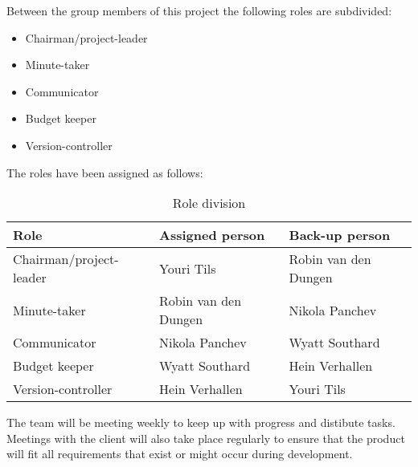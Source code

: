 Between the group members of this project the following roles are subdivided:
\begin{itemize}
    \setlength\itemsep{-0.3em}
    \item Chairman/project-leader
    \item Minute-taker
    \item Communicator
    \item Budget keeper
    \item Version-controller
\end{itemize}

The roles have been assigned as follows:
\begin{table}[!h]
    \begin{tabular}{|l|l|l|}
        \hline
        \textbf{Role}           & \textbf{Assigned person}  & \textbf{Back-up person} \\ \hline
        Chairman/project-leader & Youri Tils                & Robin van den Dungen    \\ \hline
        Minute-taker            & Robin van den Dungen      & Nikola Panchev          \\ \hline
        Communicator            & Nikola Panchev            & Wyatt Southard          \\ \hline
        Budget keeper           & Wyatt Southard            & Hein Verhallen          \\ \hline
        Version-controller      & Hein Verhallen            & Youri Tils              \\ \hline
    \end{tabular}
    \caption{Role division}
\end{table}
The team will be meeting weekly to keep up with progress and distibute tasks. Meetings with the client
will also take place regularly to ensure that the product will fit all requirements that exist or might occur during 
development. 
